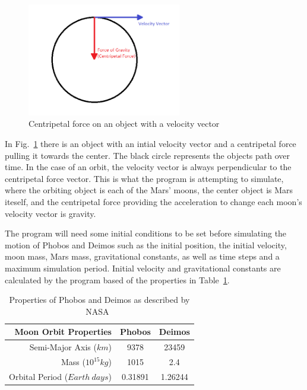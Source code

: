 \documentclass[11pt]{article}
\begin{document}
\begin{figure}[ht]
  \centering
  \includegraphics[width=0.6\textwidth, angle =0]{../images/centripetal-force}
  \caption{Centripetal force on an object with a velocity vector}
  \label{fig:centripetal}
\end{figure}
\noindent
In Fig.~\ref{fig:centripetal} there is an object with an intial velocity vector
and a centripetal force pulling it towards the center. The black circle represents
the objects path over time. In the case of an orbit, the velocity vector is always 
perpendicular to the centripetal force vector. This is what the program is attempting to simulate,
where the orbiting object is each of the Mars' moons, the center object is Mars
iteself, and the centripetal force providing the acceleration to change each moon's
velocity vector is gravity.

\vspace{\baselineskip} \noindent
The program will need some initial conditions to be set before simulating
the motion of Phobos and Deimos such as the initial position, the initial
velocity, moon mass, Mars mass, gravitational constants, as well as time steps and a maximum 
simulation period. Initial velocity and gravitational constants are calculated
by the program based of the properties in Table~\ref{table:moon-properties}.

\begin{table}[ht]
  \centering
  \begin{tabular}{|r|c|c|}
  \hline
  Moon Orbit Properties                & Phobos  & Deimos  \\ \hline
  Semi-Major Axis ($km$)                 & 9378    & 23459   \\ \hline
  Mass ($10^{15} kg$) & 1015    & 2.4     \\ \hline
  Orbital Period ($Earth\ days$)          & 0.31891 & 1.26244 \\ \hline
  \end{tabular}
  \label{table:moon-properties}
  \caption{Properties of Phobos and Deimos as described by NASA~\cite{nasa}}
  \end{table}
\end{document}
